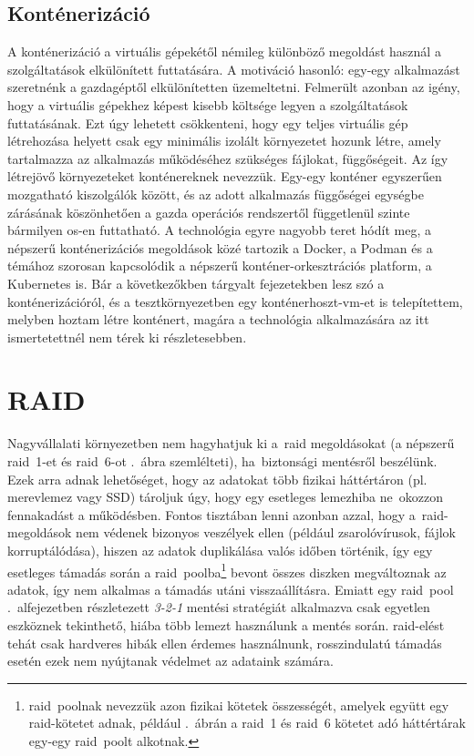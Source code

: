 \subsection{Konténerizáció}
A konténerizáció a virtuális gépekétől némileg különböző megoldást használ a szolgáltatások elkülönített futtatására. A motiváció hasonló: egy-egy alkalmazást szeretnénk a gazdagéptől elkülönítetten üzemeltetni. Felmerült azonban az igény, hogy a virtuális gépekhez képest kisebb költsége legyen a szolgáltatások futtatásának. Ezt úgy lehetett csökkenteni, hogy egy teljes virtuális gép létrehozása helyett csak egy minimális izolált környezetet hozunk létre, amely tartalmazza az alkalmazás működéséhez szükséges fájlokat, függőségeit. Az így létrejövő környezeteket konténereknek nevezzük. Egy-egy konténer egyszerűen mozgatható kiszolgálók között, és az adott alkalmazás függőségei egységbe zárásának köszönhetően a gazda operációs rendszertől függetlenül szinte bármilyen \acrshort{os}-en futtatható. A technológia egyre nagyobb teret hódít meg, a népszerű konténerizációs megoldások közé tartozik a Docker, a Podman és a témához szorosan kapcsolódik a népszerű konténer-orkesztrációs platform, a Kubernetes is. Bár a következőkben tárgyalt fejezetekben lesz szó a konténerizációról, és a tesztkörnyezetben egy konténerhoszt-\acrshort{vm}-et is telepítettem, melyben hoztam létre konténert, magára a technológia alkalmazására az itt ismertetettnél nem térek ki részletesebben.

\section{RAID}
\label{sect:raid}
Nagyvállalati környezetben nem hagyhatjuk ki a~\acrfull{raid} megoldásokat (a népszerű \acrshort{raid}~1-et és \acrshort{raid}~6-ot .~ábra szemlélteti), ha~biztonsági mentésről beszélünk. Ezek arra adnak lehetőséget, hogy az adatokat több fizikai háttértáron (pl. merevlemez vagy SSD) tároljuk úgy, hogy egy esetleges lemezhiba ne~okozzon fennakadást a működésben. Fontos tisztában lenni azonban azzal, hogy a~\acrshort{raid}-megoldások nem védenek bizonyos veszélyek ellen (például zsarolóvírusok, fájlok korruptálódása), hiszen az adatok duplikálása valós időben történik, így egy esetleges támadás során a \acrshort{raid}~poolba\footnote{\acrshort{raid}~poolnak nevezzük azon fizikai kötetek összességét, amelyek együtt egy \acrshort{raid}-kötetet adnak, például .~ábrán a \acrshort{raid}~1 és \acrshort{raid}~6 kötetet adó háttértárak egy-egy \acrshort{raid}~poolt alkotnak.} bevont összes diszken megváltoznak az adatok, így nem alkalmas a támadás utáni visszaállításra. Emiatt egy \acrshort{raid}~pool .~alfejezetben részletezett \textit{3-2-1} mentési stratégiát alkalmazva csak egyetlen eszköznek tekinthető, hiába több lemezt használunk a mentés során. \acrshort{raid}-elést tehát csak hardveres hibák ellen érdemes használnunk, rosszindulatú támadás esetén ezek nem nyújtanak védelmet az adataink számára.

